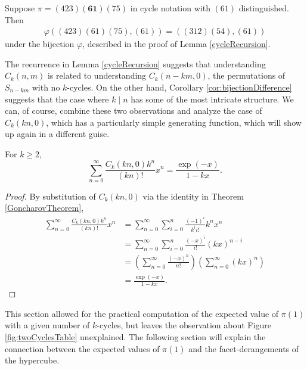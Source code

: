 \begin{example}
  Suppose $\pi = (423)\mathbf{(61)}(75)$ in cycle notation with $(61)$ distinguished.
  Then \begin{align}
    \varphi((423)(61)(75), (61)) = ((312)(54), (61))
  \end{align} under the bijection $\varphi$, described in the proof of
  Lemma \ref{cycleRecursion}.
\end{example}
The recurrence in Lemma \ref{cycleRecursion} suggests that understanding
$C_k(n,m)$ is related to understanding $C_k(n-km, 0)$,
the permutations of $S_{n-km}$ with no $k$-cycles.
On the other hand,
Corollary \ref{cor:bijectionDifference} suggests that the case where $k \mid n$
has some of the most intricate structure.
We can, of course, combine these two observations and analyze the case of
$C_k(kn, 0)$, which has a particularly simple generating function, which will
show up again in a different guise.
\begin{lemma}
  For $k \geq 2$,
  \label{cycleEGF}
  \begin{equation}
    \sum_{n=0}^\infty \frac{C_k(kn, 0)k^n}{(kn)!}x^n
    = \frac{\exp(-x)}{1-kx}.
  \end{equation}
\end{lemma}
\begin{proof}
  By substitution of $C_k(kn, 0)$ via the identity in Theorem \ref{GoncharovTheorem},
  \begin{align}
    \sum_{n=0}^\infty \frac{C_k(kn, 0)k^n}{(kn)!}x^n
    &= \sum_{n=0}^\infty \sum_{i=0}^n \frac{(-1)^i}{k^i i!}k^nx^n \\
    &= \sum_{n=0}^\infty \sum_{i=0}^n \frac{(-x)^i}{i!}(kx)^{n-i} \\
    &= \left(\sum_{n=0}^\infty \frac{(-x)^n}{n!}\right) \left(\sum_{n=0}^\infty (kx)^n\right) \\
    &= \frac{\exp(-x)}{1-kx}.
  \end{align}
\end{proof}

This section allowed for the practical computation of the expected value of
$\pi(1)$ with a given number of $k$-cycles, but leaves the observation about
Figure \ref{fig:twoCyclesTable} unexplained. The following section will
explain the connection between the expected values of $\pi(1)$ and the
facet-derangements of the hypercube.

